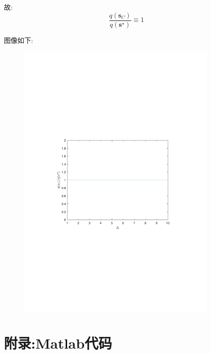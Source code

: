 \documentclass[UTF8]{ctexart}
\begin{document}
\begin{enumerate}
\begin{enumerate}
故:
\[\dfrac{q(\bm{s}_C)}{q(\bm{s}^{\star})}\equiv 1\]

图像如下:
\begin{figure}[H]
\centering
\includegraphics[width=10cm]{5.pdf}
\end{figure}
\end{enumerate}
\end{enumerate}



\newpage
\section*{附录:Matlab代码}
\end{document}
